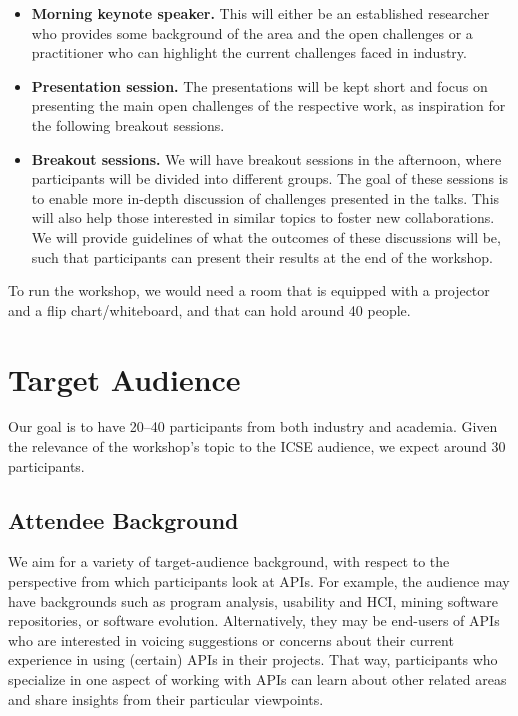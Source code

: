 \documentclass[sigconf]{acmart}
\newcommand{\updated}[1]{#1}
\begin{document}
\begin{itemize}
\setlength\itemsep{5pt}
\item \textbf{Morning keynote speaker.} This will either be an established researcher who provides some background of the area and the open challenges or a practitioner who can highlight the current challenges faced in industry.
\item \textbf{Presentation session.} \updated{The presentations will be kept short and focus on presenting the main open challenges of the respective work, as inspiration for the following breakout sessions.}
\item \textbf{Breakout sessions.} \updated{We will have breakout sessions in the afternoon, where participants will be divided into different groups. The goal of these sessions is to enable more in-depth discussion of challenges presented in the talks. This will also help those interested in similar topics to foster new collaborations. We will provide guidelines of what the outcomes of these discussions will be, such that participants can present their results at the end of the workshop.}
\end{itemize}

To run the workshop, we would need a room that is equipped with a projector and a flip chart/whiteboard, and that can hold around 40 people.

\section{Target Audience}

Our goal is to have 20--40 participants from both industry and academia. Given the relevance of the workshop's topic to the ICSE audience, we expect around 30 participants.

\subsection{Attendee Background} 
We aim for a variety of target-audience background, with respect to the perspective from which participants look at APIs. For example, the audience may have backgrounds such as program analysis, usability and HCI, mining software repositories, or software evolution. Alternatively, they may be end-users of APIs who are interested in voicing suggestions or concerns about their current experience in using (certain) APIs in their projects. That way, participants who specialize in one aspect of working with APIs can learn about other related areas and share insights from their particular viewpoints.
\end{document}
